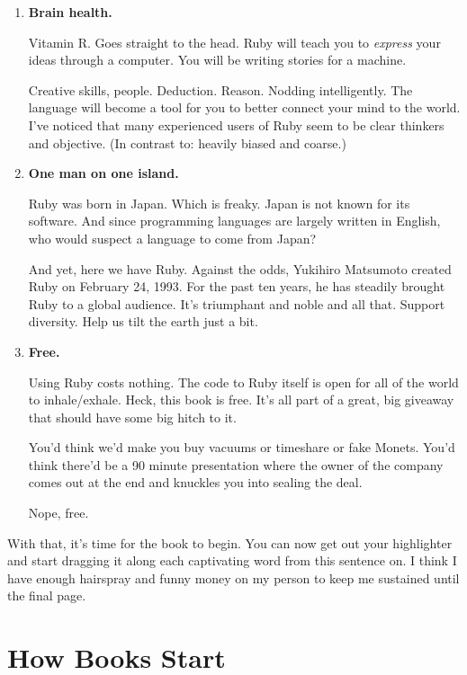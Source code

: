 \documentclass[12pt,twoside]{report}
\begin{document}
\begin{enumerate}
\item {\bf Brain health.}

Vitamin R.  Goes straight to the head.  Ruby will teach you to {\em
  express} your ideas through a computer.  You will be writing stories
for a machine.

 

Creative skills, people.  Deduction.  Reason.  Nodding
intelligently. The language will become a tool for you to better
connect your mind to the world. I've noticed that many experienced
users of Ruby seem to be clear thinkers and objective.  (In contrast
to: heavily biased and coarse.)


\item {\bf One man on one island.}

Ruby was born in Japan.  Which is freaky.  Japan is not known for its
software.  And since programming languages are largely written in
English, who would suspect a language to come from Japan?

 

And yet, here we have Ruby.  Against the odds, Yukihiro Matsumoto
created Ruby on February 24, 1993.  For the past ten years, he has
steadily brought Ruby to a global audience.  It's triumphant and noble
and all that.  Support diversity. Help us tilt the earth just a bit.


\item {\bf Free.}

Using Ruby costs nothing.  The code to Ruby itself is open for all of
the world to inhale/exhale.  Heck, this book is free.  It's all part
of a great, big giveaway that should have some big hitch to it.

 

You'd think we'd make you buy vacuums or timeshare or fake
Monets. You'd think there'd be a 90 minute presentation where the
owner of the company comes out at the end and knuckles you into
sealing the deal.

 

Nope, free.


\end{enumerate}

With that, it's time for the book to begin.  You can now get out your
highlighter and start dragging it along each captivating word from
this sentence on.  I think I have enough hairspray and funny money on
my person to keep me sustained until the final page.


\section{How Books Start}
\end{document}

